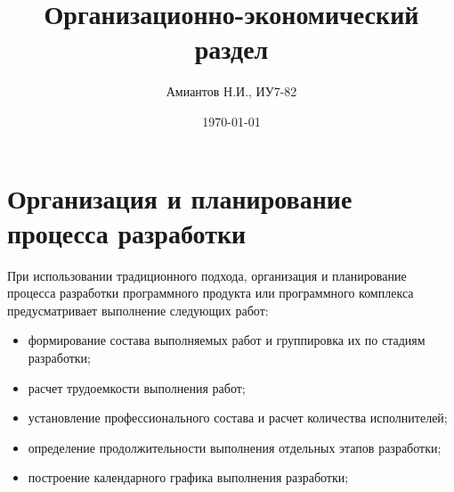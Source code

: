 \documentclass[a4paper,12pt]{article}\usepackage[]{graphicx}\usepackage[]{color}
\title{Организационно-экономический раздел}
\author{Амиантов Н.И., ИУ7-82}
\date{\today}
\numberwithin{equation}{section}
\begin{document}
\maketitle

\section{Организация и планирование процесса разработки}
При использовании традиционного подхода, организация и планирование процесса
разработки программного продукта или программного комплекса предусматривает
выполнение следующих работ:
\begin{itemize}
\item формирование  состава  выполняемых  работ  и  группировка  их  по 
стадиям разработки;
\item расчет трудоемкости выполнения работ; 
\item установление  профессионального  состава  и  расчет  количества 
исполнителей; 
\item определение  продолжительности  выполнения  отдельных  этапов 
разработки; 
\item построение календарного графика выполнения разработки; 
\end{itemize}
 
\end{document}
